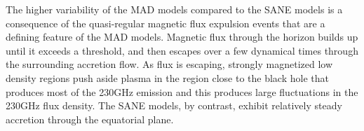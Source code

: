 The higher variability of the MAD models compared to the SANE models is a consequence of the quasi-regular magnetic flux expulsion events that are a defining feature of the MAD models. Magnetic flux through the horizon builds up until it exceeds a threshold, and then escapes over a few dynamical times through the surrounding accretion flow.  As flux is escaping, strongly magnetized low density regions push aside plasma in the region close to the black hole that produces most of the 230GHz emission and this produces large fluctuations in the 230GHz flux density.  The SANE models, by contrast, exhibit relatively steady accretion through the equatorial plane.





